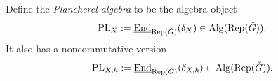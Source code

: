 \documentclass[reqno]{amsart}
\numberwithin{equation}{section}
\numberwithin{equation}{section}
\begin{document}
Define the \emph{Plancherel algebra} to be the algebra object \begin{equation}
    \mathrm{PL}_X:=\underline{\operatorname{End}}_{\operatorname{Rep}(\check{G})}(\delta_X)\in \mathrm{Alg}(\operatorname{Rep}(\check{G})).
\end{equation} It also has a noncommutative version
\begin{equation}
    \mathrm{PL}_{X,\hbar}:=\underline{\operatorname{End}}_{\operatorname{Rep}(\check{G})}(\delta_{X,\hbar})\in \mathrm{Alg}(\operatorname{Rep}(\check{G})).
\end{equation}

\end{document}
